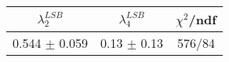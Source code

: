 \begin{tabular}{c|c||c}
$\lambda_{2}^{LSB}$ & $\lambda_4^{LSB}$ & $\chi^{2}$/ndf \\
\hline
0.544 $\pm$ 0.059 & 0.13 $\pm$ 0.13 & 576/84\\
\end{tabular}
